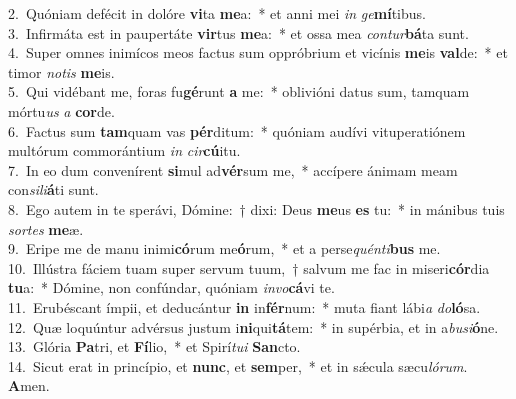 {2.~}Quóniam defécit in dolóre \textbf{vi}ta \textbf{me}a:~* et anni mei \textit{in} \textit{ge}\textbf{mí}tibus.\\
{3.~}Infirmáta est in paupertáte \textbf{vir}tus \textbf{me}a:~* et ossa mea \textit{con}\textit{tur}\textbf{bá}ta sunt.\\
{4.~}Super omnes inimícos meos factus sum oppróbrium et vicínis \textbf{me}is \textbf{val}de:~* et timor \textit{no}\textit{tis} \textbf{me}is.\\
{5.~}Qui vidébant me, foras fu\textbf{gé}runt \textbf{a} me:~* oblivióni datus sum, tamquam mórtu\textit{us} \textit{a} \textbf{cor}de.\\
{6.~}Factus sum \textbf{tam}quam vas \textbf{pér}ditum:~* quóniam audívi vituperatiónem multórum commorántium \textit{in} \textit{cir}\textbf{cú}itu.\\
{7.~}In eo dum convenírent \textbf{si}mul ad\textbf{vér}sum me,~* accípere ánimam meam con\textit{si}\textit{li}\textbf{á}ti sunt.\\
{8.~}Ego autem in te sperávi, Dómine:~† dixi: Deus \textbf{me}us \textbf{es} tu:~* in mánibus tuis \textit{sor}\textit{tes} \textbf{me}æ.\\
{9.~}Eripe me de manu inimi\textbf{có}rum me\textbf{ó}rum,~* et a perse\textit{quén}\textit{ti}\textbf{bus} me.\\
{10.~}Illústra fáciem tuam super servum tuum,~† salvum me fac in miseri\textbf{cór}dia \textbf{tu}a:~* Dómine, non confúndar, quóniam \textit{in}\textit{vo}\textbf{cá}vi te.\\
{11.~}Erubéscant ímpii, et deducántur \textbf{in} in\textbf{fér}num:~* muta fiant lábi\textit{a} \textit{do}\textbf{ló}sa.\\
{12.~}Quæ loquúntur advérsus justum i\textbf{ni}qui\textbf{tá}tem:~* in supérbia, et in a\textit{bu}\textit{si}\textbf{ó}ne.\\
{13.~}Glória \textbf{Pa}tri, et \textbf{Fí}lio,~* et Spirí\textit{tu}\textit{i} \textbf{San}cto.\\
{14.~}Sicut erat in princípio, et \textbf{nunc}, et \textbf{sem}per,~* et in sǽcula sæcu\textit{ló}\textit{rum}. \textbf{A}men.\\
